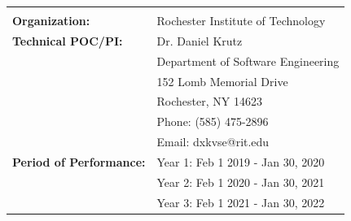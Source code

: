 \documentclass[12pt]{article}
\begin{document}
\begin{titlepage}
\begin{tabular}{ L{50mm} L{100mm} }
\normalsize  \\ %
\normalsize \textbf{Organization:} & \normalsize  Rochester Institute of Technology  \\
\normalsize \textbf{Technical POC/PI:} & \normalsize  Dr. Daniel Krutz \\
 & \vspace{-2mm} \normalsize Department of Software Engineering
 \\
 
   & \vspace{-4mm} \normalsize 152 Lomb Memorial Drive \\
   & \vspace{-6mm} \normalsize Rochester, NY 14623 \\
   & \vspace{-8mm} \normalsize Phone: (585) 475-2896 \\
   & \vspace{-10mm} \normalsize Email: dxkvse@rit.edu \\
     

 \vspace{-8mm}    \normalsize \textbf{Period of Performance:} &  \vspace{-8mm} \normalsize Year 1: Feb 1 2019 - Jan 30, 2020 \\
 &  \vspace{-9mm} \normalsize Year 2: Feb 1 2020 - Jan 30, 2021 \\
  &  \vspace{-11mm} \normalsize Year 3: Feb 1 2021 - Jan 30, 2022 \\
  

\end{tabular}






 \end{titlepage}
\end{document}

